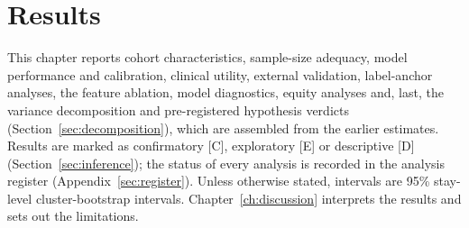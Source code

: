 \chapter{Results}
\label{ch:evaluation}

This chapter reports cohort characteristics, sample-size adequacy, model
performance and calibration, clinical utility, external validation,
label-anchor analyses, the feature ablation, model diagnostics, equity analyses
and, last, the variance decomposition and pre-registered hypothesis verdicts
(Section~\ref{sec:decomposition}), which are assembled from the earlier
estimates. Results are marked as confirmatory [C], exploratory [E] or
descriptive [D] (Section~\ref{sec:inference}); the status of every analysis is
recorded in the analysis register (Appendix~\ref{sec:register}). Unless
otherwise stated, intervals are 95\% stay-level cluster-bootstrap intervals.
Chapter~\ref{ch:discussion} interprets the results and sets out the
limitations.











